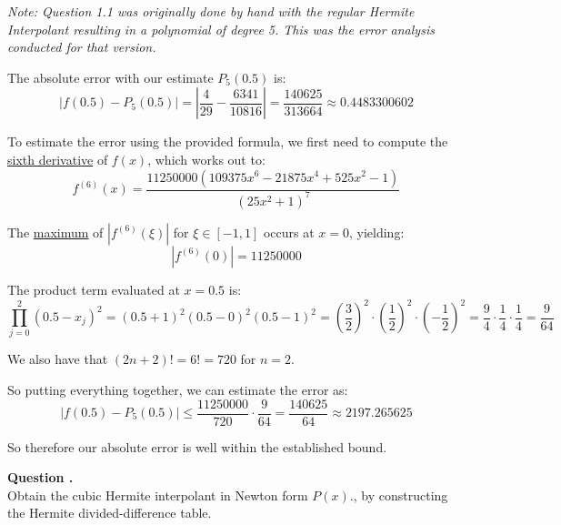 \documentclass[12pt]{article}
\newcounter{question}
\newcounter{subquest}
\newcommand{\subquestion}{
    \stepcounter{subquest} 
    \vspace{.5em}
    \textbf{\large Question \thequestion.\thesubquest}
    \vspace{.25em}\ \\}
\begin{document}

\emph{Note: Question 1.1 was originally done by hand with the regular Hermite Interpolant resulting in a polynomial of degree 5. This was the error analysis conducted for that version.}

The absolute error with our estimate $P_5(0.5)$ is:
\[|f(0.5)-P_5(0.5)| = \left|\frac{4}{29} - \frac{6341}{10816}\right| = \frac{140625}{313664} \approx 0.4483300602\]

To estimate the error using the provided formula, we first need to compute the \href{https://www.derivative-calculator.net/}{sixth derivative} of $f(x)$, which works out to:
\[f^{(6)}(x) = \frac{11250000 \left(109375x^{6} - 21875x^{4} + 525x^{2} - 1\right)}{\left(25x^{2} + 1\right)^{7}}\]


The \href{https://www.wolframalpha.com/input?i=maximum+calculator&assumption=%7B%22F%22%2C+%22GlobalMaximizeCalculator%22%2C+%22curvefunction%22%7D+-%3E%22abs%2811250000%28109375x%5E6-21875x%5E4%2B525x%5E2-1%29%2F%28%2825x%5E2%2B1%29%5E7%29%29%22&assumption=%7B%22F%22%2C+%22GlobalMaximizeCalculator%22%2C+%22domain%22%7D+-%3E%22-1+%3C%3D+x+%3C%3D+1%22}{maximum} of $|f^{(6)}(\xi)|$ for $\xi \in [-1,1]$ occurs at $x=0$, yielding:
\[|f^{(6)}(0)| = 11250000\]

The product term evaluated at $x=0.5$ is:
\[\prod_{j=0}^{2}(0.5 - x_j)^2 = (0.5 + 1)^2 (0.5 - 0)^2 (0.5 - 1)^2 = \left(\frac{3}{2}\right)^2 \cdot \left(\frac{1}{2}\right)^2 \cdot \left(-\frac{1}{2}\right)^2 = \frac{9}{4} \cdot \frac{1}{4} \cdot \frac{1}{4} = \frac{9}{64}\]

We also have that $(2n+2)! = 6! = 720$ for $n=2$.

So putting everything together, we can estimate the error as:
\[\left|f(0.5)-P_5(0.5)\right| \leq \frac{11250000}{720} \cdot \frac{9}{64} = \frac{140625}{64} \approx 2197.265625\]

So therefore our absolute error is well within the established bound.

\subquestion
Obtain the cubic Hermite interpolant in Newton form $P(x)$., by constructing the Hermite divided-difference table.
\end{document}
